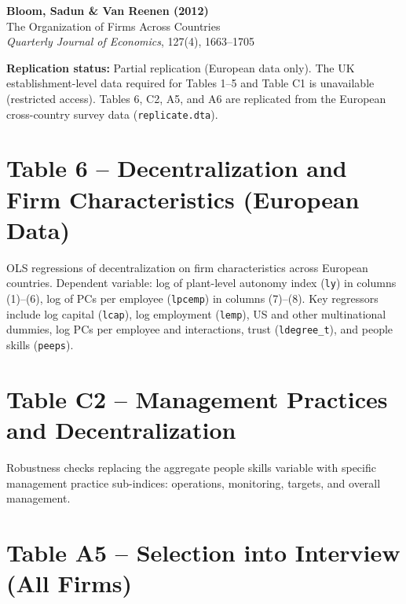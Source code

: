 \documentclass[12pt]{article}
\begin{document}
\begin{center}
{\Large\bfseries Bloom, Sadun \& Van Reenen (2012)}\\
{\large The Organization of Firms Across Countries}\\
\vspace{0.5em}
{\normalsize \textit{Quarterly Journal of Economics}, 127(4), 1663--1705}
\end{center}

\vspace{1em}
\noindent\textbf{Replication status:} Partial replication (European data only).
The UK establishment-level data required for Tables 1--5 and Table C1 is unavailable
(restricted access). Tables 6, C2, A5, and A6 are replicated from the European
cross-country survey data (\texttt{replicate.dta}).

\tableofcontents

\clearpage
\section{Table 6 -- Decentralization and Firm Characteristics (European Data)}

OLS regressions of decentralization on firm characteristics across European countries.
Dependent variable: log of plant-level autonomy index (\texttt{ly}) in columns (1)--(6),
log of PCs per employee (\texttt{lpcemp}) in columns (7)--(8).
Key regressors include log capital (\texttt{lcap}), log employment (\texttt{lemp}),
US and other multinational dummies, log PCs per employee and interactions,
trust (\texttt{ldegree\_t}), and people skills (\texttt{peeps}).



\clearpage
\section{Table C2 -- Management Practices and Decentralization}

Robustness checks replacing the aggregate people skills variable with specific
management practice sub-indices: operations, monitoring, targets, and overall management.



\clearpage
\section{Table A5 -- Selection into Interview (All Firms)}
\end{document}
